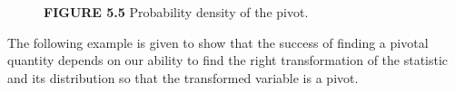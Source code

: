 \begin{figure}[h]
\centering
{}
\caption*{\textbf{FIGURE 5.5} Probability density of the pivot.}
\end{figure}

The following example is given to show that the success of finding a pivotal quantity depends on our ability to find the right transformation of the statistic and its distribution so that the transformed variable is a pivot.
